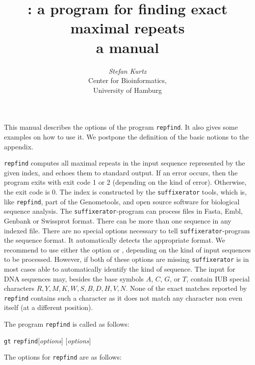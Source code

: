 \documentclass[12pt]{article}
\title{\Repfind: a program for finding exact maximal repeats\\
       a manual}
\author{\begin{tabular}{c}
         \textit{Stefan Kurtz}\\
         Center for Bioinformatics,\\
         University of Hamburg
        \end{tabular}}
\newcommand{\Repfind}[0]{\texttt{repfind}\xspace}
\newcommand{\Suffixerator}[0]{\texttt{suffixerator}\xspace}
\begin{document}
\maketitle
This manual describes the options of the program \Repfind. It also gives
some examples on how to use it. We postpone the 
definition of the basic notions to the appendix.

\Repfind computes all maximal repeats in 
the input sequence represented by the given index,
and echoes them to standard output. 
If an error occurs, then the program exits with exit code 1 or 2 (depending on
the kind of error). Otherwise, the exit code is 0. The index is constructed
by the \Suffixerator tools, which is, like \Repfind, part of the
Genometools, and open source software for biological sequence analysis.
The \Suffixerator-program can process files in Fasta, Embl, Genbank or
Swissprot format. There can be more than one sequence in any
indexed file.  There are no special options necessary to tell 
\Suffixerator-program the sequence format. It automatically detects the 
appropriate format. We recommend to use either the option  or 
, depending on the kind of input sequences to be processed.
However, if both of these options are missing \Suffixerator is in most
cases able to automatically identify the kind of sequence. The input for
DNA sequences may, besides the base symbols \(A\), \(C\), \(G\), or \(T\),
contain IUB special characters \(R,Y,M,K,W,S,B,D,H,V,N\). None of the
exact matches reported by \Repfind contains such a character as it
does not match any character non even itself (at a different position).

The program \Repfind is called as follows:
\par
\noindent\texttt{gt} \Repfind [\textit{options}] 
 [\textit{options}] 

The options for \Repfind are as follows:

\begin{Justshowoptions}







\end{Justshowoptions}
\end{document}
